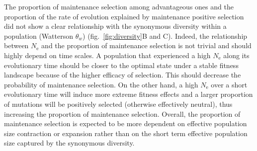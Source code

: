 \documentclass{article}
\newcommand{\Ne}{N_{\textrm{e}}}
\begin{document}
    The proportion of maintenance selection among advantageous ones and the proportion of the rate of evolution explained by maintenance positive selection did not show a clear relationship with the synonymous diversity within a population (Watterson $\theta_w$) (fig.~\ref{fig:diversity}B and C).
    Indeed, the relationship between $\Ne$ and the proportion of maintenance selection is not trivial and should highly depend on time scales.
    A population that experienced a high $\Ne$ along its evolutionary time should be closer to the optimal state under a stable fitness landscape because of the higher efficacy of selection.
    This should decrease the probability of maintenance selection.
    On the other hand, a high $\Ne$ over a short evolutionary time will induce more extreme fitness effects and a larger proportion of mutations will be positively selected (otherwise effectively neutral), thus increasing the proportion of maintenance selection.
    Overall, the proportion of maintenance selection is expected to be more dependent on effective population size contraction or expansion rather than on the short term effective population size captured by the synonymous diversity.
\end{document}
